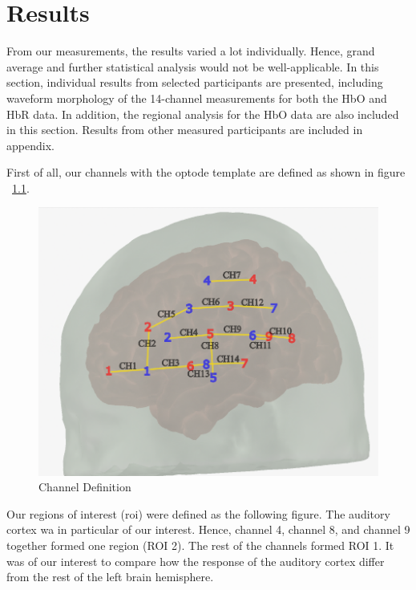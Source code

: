 \chapter{Results}

From our measurements, the results varied a lot individually. Hence, grand average and further statistical analysis would not be well-applicable. In this section, individual results from selected participants are presented, including waveform morphology of the 14-channel measurements for both the HbO and HbR data. In addition, the regional analysis for the HbO data are also included in this section. Results from other measured participants are included in appendix.

First of all, our channels with the optode template are defined as shown in figure ~\ref{fig:ChannelDef}.

\begin{figure}[H]
  \centering
    \includegraphics[scale=.45]{bilder/optode_ink.png}
  \caption{Channel Definition}
  \label{fig:ChannelDef}
\end{figure}


Our regions of interest (\acrshort{roi}) were defined as the following figure. The auditory cortex wa in particular of our interest. Hence, channel 4, channel 8, and channel 9 together formed one region (ROI 2). The rest of the channels formed ROI 1. It was of our interest to compare how the response of the auditory cortex differ from the rest of the left brain hemisphere.


